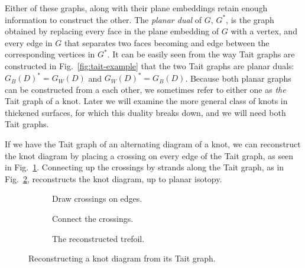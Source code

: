 \documentclass[12pt]{report}
\theoremstyle{upright}
\begin{document}
Either of these graphs, along with their plane embeddings retain enough information to construct the other. The \textit{planar dual} of $G$, $G^{*}$, is the graph obtained by replacing every face in the plane embedding of $G$ with a vertex, and every edge in $G$ that separates two faces becoming and edge between the corresponding vertices in $G^{*}$. It can be easily seen from the way Tait graphs are constructed in Fig.~\ref{fig:tait-example} that the two Tait graphs are planar duals: $G_{B}(D)^{*} = G_{W}(D)$ and $G_{W}(D)^{*} = G_{B}(D)$. Because both planar graphs can be constructed from a each other, we sometimes refer to either one as \textit{the} Tait graph of a knot. Later we will examine the more general class of knots in thickened surfaces, for which this duality breaks down, and we will need both Tait graphs.

If we have the Tait graph of an alternating diagram of a knot, we can reconstruct the knot diagram by placing a crossing on every edge of the Tait graph, as seen in Fig.~\ref{fig:trefoil-tait-with-crossings}. Connecting up the crossings by strands along the Tait graph, as in Fig.~\ref{fig:trefoil-resconstructed},	 reconstructs the knot diagram, up to planar isotopy.

\begin{figure}[h]
	\centering
	\hspace*{\fill}
	\begin{subfigure}[b]{0.3 \textwidth}
		\centering
		\def\svgscale{0.22}
		
		\caption{Draw crossings on edges.}
		\label{fig:trefoil-tait-with-crossings}
	\end{subfigure}
	\hspace*{\fill}
	\begin{subfigure}[b]{0.3 \textwidth}
		\centering
		\def\svgscale{0.22}
		
		\caption{Connect the crossings.}
		\label{fig:trefoil-resconstructed}
	\end{subfigure}
	\hspace*{\fill}
	\begin{subfigure}[b]{0.3 \textwidth}
		\centering
		\def\svgscale{0.2}
		
		\caption{The reconstructed trefoil.}
		\label{fig:trefoil-resconstructed-isotopy}
	\end{subfigure}
	\hspace*{\fill}
	\caption{Reconstructing a knot diagram from its Tait graph.}
	\label{fig:tait-reconstruction-example}
\end{figure}
\end{document}
